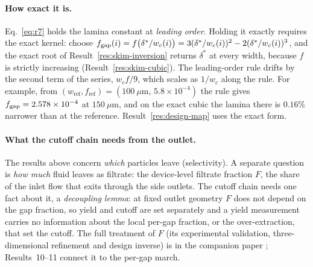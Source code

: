 \paragraph{How exact it is.} Eq.~\eqref{eq:r7} holds the lamina constant at \emph{leading
order}. Holding it exactly requires the exact kernel: choose
$f_{\mathrm{gap}}(i)=f\big(\delta^*/w_c(i)\big)=3(\delta^*/w_c(i))^2-2(\delta^*/w_c(i))^3$, and the exact
root of Result~\ref{res:skim-inversion} returns $\delta^*$ at every width, because $f$ is
strictly increasing (Result~\ref{res:skim-cubic}). The leading-order rule drifts by the second
term of the series, $w_c f/9$, which scales as $1/w_c$ along the rule. For example, from
$(w_{\text{ref}},f_{\text{ref}})=(100~\mu\mathrm{m},\,5.8\times10^{-4})$ the rule gives
$f_{\mathrm{gap}}=2.578\times10^{-4}$ at $150~\mu$m, and on the exact cubic the lamina there is $0.16\%$
narrower than at the reference. Result~\ref{res:design-map} uses the exact form.

\label{res:decoupling}

\paragraph{What the cutoff chain needs from the outlet.} The results above concern
\emph{which} particles leave (selectivity). A separate question is \emph{how much} fluid leaves
as filtrate: the device-level filtrate fraction $F$, the share of the inlet flow that exits
through the side outlets. The cutoff chain needs one fact about it, a \emph{decoupling lemma}:
at fixed outlet geometry $F$ does not depend on the gap fraction, so yield and cutoff are set
separately and a yield measurement carries no information about the local per-gap fraction, or
the over-extraction, that set the cutoff. The full treatment
of $F$ (its experimental validation, three-dimensional refinement and design inverse) is in
the companion paper \cite{bpre}; Results~10--11 connect it to the per-gap march.

